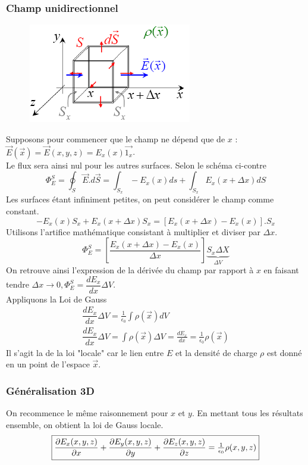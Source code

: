 \documentclass	[11pt, a4paper, openany]{book}
\begin{document}
\subsubsection{Champ unidirectionnel}
\begin{figure}
	\includegraphics[scale=0.44]{es/image8.png}
\end{figure}
Supposons pour commencer que le champ ne dépend que de $x$ : $\vec{E}(\vec{x}) = \vec{E}(x,y,z) = E_x(x)\vec{1_x}$.\\
Le flux sera ainsi nul pour les autres surfaces. Selon le schéma ci-contre
\begin{equation}
	\Phi^S_E = \oint_S \vec{E}.d\vec{S} = \int_{S_x} -E_x(x)ds +  \int_{S_x} E_x(x+\Delta x)dS
\end{equation}
Les surfaces étant infiniment petites, on peut considérer le champ comme constant.
\begin{equation}
	-E_x(x)S_x + E_x(x+\Delta x)S_x = \left[E_x(x+\Delta x) - E_x(x)\right].S_x
\end{equation}
Utilisons l'artifice mathématique consistant à multiplier et diviser par $\Delta x$.
\begin{equation}
	\Phi^S_E = \left[\frac{E_x(x+\Delta x) - E_x(x)}{\Delta x}\right]\underbrace{S_x\Delta X}_{\Delta V}
\end{equation}
On retrouve ainsi l'expression de la dérivée du champ par rapport à $x$ en faisant tendre $\Delta x \rightarrow 0, \Phi_E^S = \dfrac{dE_x}{dx}\Delta V$.\\
Appliquons la Loi de Gauss
\begin{eqnarray}
	\dfrac{dE_x}{dx}\Delta V = \frac{1}{\epsilon_0}\int \rho(\vec x) dV\\
	\dfrac{dE_x}{dx}\Delta V =\int \rho(\vec x) \Delta V =
	\frac{dE_x}{dx} = \frac{1}{\epsilon_0}\rho(\vec{x})
\end{eqnarray}
Il s'agit la de la loi "locale" car le lien entre $E$ et la densité de charge $\rho$ est donné en un point de l'espace $\vec{x}$.

\subsubsection{Généralisation 3D}
On recommence le même raisonnement pour $x$ et $y$. En mettant tous les résultats ensemble, on obtient la loi de Gauss locale. 
\begin{equation}
	\fbox{$\dfrac{\partial E_x(x,y,z)}{\partial x} + \dfrac{\partial E_y(x,y,z)}{\partial y} + \dfrac{\partial E_z(x,y,z)}{\partial z} = \frac{1}{\epsilon_0}\rho(x,y,z)$}
\end{equation}
\end{document}
